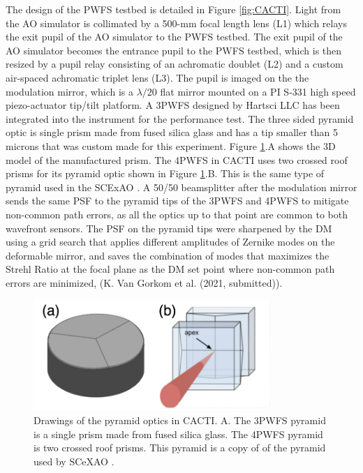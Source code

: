 The design of the PWFS testbed is detailed in Figure \ref{fig:CACTI}. Light from the AO simulator is collimated by a 500-mm focal length lens (L1) which relays the exit pupil of the AO simulator to the PWFS testbed. The exit pupil of the AO simulator becomes the entrance pupil to the PWFS testbed, which is then resized by a pupil relay consisting of an achromatic doublet (L2) and a custom air-spaced achromatic triplet lens (L3). The pupil is imaged on the the modulation mirror, which is a $\lambda/20$ flat mirror mounted on a PI S-331 high speed piezo-actuator tip/tilt platform. A 3PWFS designed by Hartsci LLC has been integrated into the instrument for the performance test. The three sided pyramid optic is single prism made from fused silica glass and has a tip smaller than 5 microns that was custom made for this experiment. Figure \ref{fig:pyramidOptics}.A shows the 3D model of the manufactured prism. The 4PWFS in CACTI uses two crossed roof prisms for its pyramid optic shown in Figure \ref{fig:pyramidOptics}.B. This is the same type of pyramid used in the SCExAO \citep{jovanovic2015subaru}.  A 50/50 beamsplitter after the modulation mirror sends the same PSF to the pyramid tips of the 3PWFS and 4PWFS to mitigate non-common path errors, as all the optics up to that point are common to both wavefront sensors. The PSF on the pyramid tips were sharpened by the DM using a grid search that applies different amplitudes of Zernike modes on the deformable mirror, and saves the combination of modes that maximizes the Strehl Ratio at the focal plane as the  DM set point where non-common path errors are minimized, (K. Van Gorkom et al. (2021, submitted)).

\begin{figure}
    \centering
    \includegraphics[width=0.8\textwidth]{Chapter Materials/Chapter Five Materials/pyramidOptics.png}
    \caption{Drawings of the pyramid optics in CACTI. A. The 3PWFS pyramid is a single prism made from fused silica glass. The 4PWFS pyramid is two crossed roof prisms. This pyramid is a copy of of the pyramid used by SCeXAO \citep{jovanovic2015subaru}. }
    \label{fig:pyramidOptics}
\end{figure}


